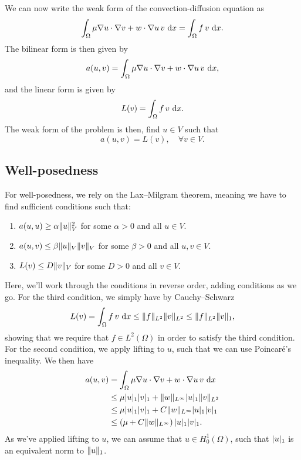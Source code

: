 We can now write the weak form of the convection-diffusion equation as
\begin{equation}
    \int_{\Omega} \mu \nabla u \cdot \nabla v + w \cdot \nabla u \, v \, \mathop{}\!\mathrm{d} x = \int_{\Omega} f \, v \, \mathop{}\!\mathrm{d} x.
\end{equation}
The bilinear form is then given by
\begin{equation}
    a(u,v) = \int_{\Omega} \mu \nabla u \cdot \nabla v + w \cdot \nabla u \, v \, \mathop{}\!\mathrm{d} x,
\end{equation}
and the linear form is given by
\begin{equation}
    L(v) = \int_{\Omega} f \, v \, \mathop{}\!\mathrm{d} x.
\end{equation}
The weak form of the problem is then, find $u \in V$ such that
\begin{equation}
    a(u,v) = L(v), \quad \forall v \in V.
\end{equation}

\subsection{Well-posedness}
For well-posedness, we rely on the Lax--Milgram theorem, meaning we have to find sufficient conditions such that: %
\begin{enumerate}
    \item $a(u, u) \geq \alpha \lVert u\rVert^2_V$ for some $\alpha > 0$ and all $u \in V$.
    \item $a(u, v) \leq \beta \lVert u\rVert_V \lVert v\rVert_V$ for some $\beta > 0$ and all $u, v \in V$.
    \item $L(v) \leq D \lVert v\rVert_V$ for some $D > 0$ and all $v \in V$.
\end{enumerate}

Here, we'll work through the conditions in reverse order, adding conditions as we go.
For the third condition, we simply have by Cauchy--Schwarz %
\begin{equation}
    L(v) = \int_\Omega f \, v \, \mathop{}\!\mathrm{d} x \leq \lVert f\rVert_{L^2} \lVert v\rVert_{L^2} \leq \lVert f\rVert_{L^2} \lVert v\rVert_1,
\end{equation}
showing that we require that $f \in L^2(\Omega)$ in order to satisfy the third condition.
For the second condition, we apply lifting to $u$, such that we can use Poincaré's inequality.
We then have
\begin{align*}
    a(u, v)
    &= \int_{\Omega} \mu \nabla u \cdot \nabla v + w \cdot \nabla u \, v \, \mathop{}\!\mathrm{d} x \\
    &\leq \mu \lvert u\rvert_1 \lvert v\rvert_1 + \lVert w\rVert_{L^\infty} \lvert u\rvert_1 \lVert v\rVert_{L^2} \\
    &\leq \mu \lvert u\rvert_1 \lvert v\rvert_1 + C \lVert w\rVert_{L^\infty} \lvert u\rvert_1 \lvert v\rvert_1 \\
    &\leq \left( \mu + C \lVert w\rVert_{L^\infty} \right) \lvert u\rvert_1 \lvert v\rvert_1.
\end{align*}
As we've applied lifting to $u$, we can assume that $u \in H^1_0(\Omega)$, such that $\lvert u\rvert_1$ is an equivalent norm to $\lVert u\rVert_1$.

